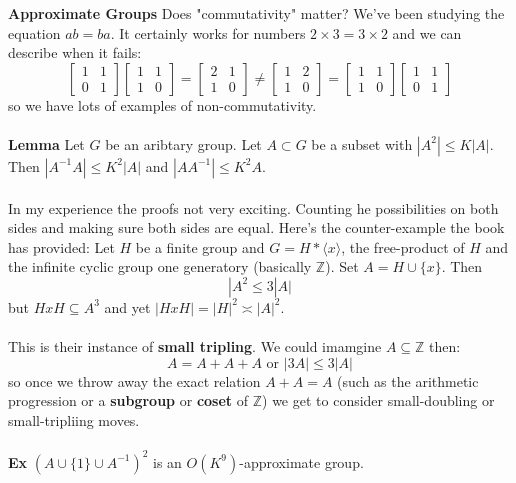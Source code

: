 \documentclass[12pt]{article}
\begin{document}
{\noindent \textbf{Approximate Groups} 
Does "commutativity" matter? We've been studying the equation $ab = ba$.  It certainly works for numbers $2 \times 3 = 3 \times 2$  and we can describe when it fails:
$$
\left[ \begin{array}{cc} 1 & 1 \\ 0 & 1 \end{array} \right]
\left[ \begin{array}{cc} 1 & 1 \\ 1 & 0 \end{array} \right] = \left[ \begin{array}{cc} 2 & 1 \\ 1 & 0 \end{array} \right] \neq \left[ \begin{array}{cc} 1 & 2 \\ 1 & 0 \end{array} \right] = 
\left[ \begin{array}{cc} 1 & 1 \\ 1 & 0 \end{array} \right]
\left[ \begin{array}{cc} 1 & 1 \\ 0 & 1 \end{array} \right] $$
so we have lots of examples of non-commutativity.  \\ \\
\textbf{Lemma} Let $G$ be an aribtary group.  Let $A \subset G$ be a subset with $|A^2| \leq K|A|$.  Then $|A^{-1}A| \leq K^2 |A|$ and $|AA^{-1}|\leq K^2 A$. \\ \\
In my experience the proofs not very exciting.  Counting he possibilities on both sides and making sure both sides are equal.  Here's the counter-example the book has provided:
Let $H$ be a finite group and $G = H \ast \langle x \rangle$, the free-product of $H$ and the {infinite cyclic group} one generatory (basically $\mathbb{Z}$).  Set $A = H \cup \{  x \}$.  Then 
\[ |A^2 \leq 3 |A| \tag{$\ast$} \]
but $HxH \subseteq A^3$ and yet $|HxH| = |H|^2 \asymp |A|^2$.  \\ \\
This is their instance of \textbf{small tripling}.  We could imamgine $A \subseteq \mathbb{Z}$ then:
$$ A = A + A + A  \text{ or } |3A| \leq 3|A| $$
so once we throw away the exact relation $A + A = A$ (such as the arithmetic progression or a \textbf{subgroup} or \textbf{coset}  of $\mathbb{Z}$) we get to consider small-doubling or small-tripliing moves. \\ \\
\textbf{Ex} $(A \cup \{  1\} \cup A^{-1})^2 $ is an $O(K^9)$-approximate group.   

}
\end{document}
